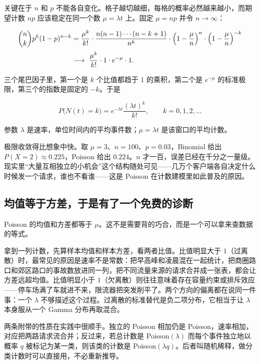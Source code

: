 关键在于 \(n\) 和 \(p\) 不能各自变化。格子越切越细，每格的概率必然越来越小，而期望计数 \(np\) 应该稳定在同一个数 \(\mu=\lambda t\) 上。固定 \(\mu=np\) 并令 \(n\to\infty\)：

\[
\begin{aligned}
\binom nk p^k(1-p)^{n-k}
&=\frac{\mu^k}{k!}\cdot\frac{n(n-1)\cdots(n-k+1)}{n^k}
\cdot\Bigl(1-\frac\mu n\Bigr)^{n}\cdot\Bigl(1-\frac\mu n\Bigr)^{-k}\\[2pt]
&\longrightarrow\ \frac{\mu^k}{k!}\cdot 1\cdot e^{-\mu}\cdot 1 .
\end{aligned}
\]

三个尾巴因子里，第一个是 \(k\) 个比值都趋于 \(1\) 的乘积，第二个是 \(e^{-\mu}\) 的标准极限，第三个的指数是固定的 \(-k\)。于是

\[
P\bigl(N(t)=k\bigr)=e^{-\lambda t}\frac{(\lambda t)^k}{k!},\qquad k=0,1,2,\ldots
\]

参数 \(\lambda\) 是速率，单位时间内的平均事件数；\(\mu=\lambda t\) 是该窗口的平均计数。

极限收敛得比想象中快。取 \(\mu=3\)、\(n=100\)、\(p=0.03\)，Binomial 给出 \(P(X=2)\approx0.225\)，Poisson 给出 \(0.224\)。\(n\) 才一百，误差已经在千分之一量级。现实里``大量互相独立的小机会''这个结构随处可见——几万个客户端各自决定什么时候发一个请求，谁也不看谁——这是 Poisson 在计数建模里如此普及的原因。

\subsection{均值等于方差，于是有了一个免费的诊断}

Poisson 的均值和方差都等于 \(\mu\)。这不是需要背的巧合，而是一个可以拿来查数据的等式。

拿到一列计数，先算样本均值和样本方差，看两者比值。比值明显大于 \(1\)（过离散）时，最常见的原因是速率不是常数：把早高峰和凌晨混在一起统计，把商圈路口和郊区路口的事故数放进同一列，把不同流量来源的请求合并成一张表，都会让方差远超均值。比值明显小于 \(1\)（欠离散）则往往意味着存在容量约束或排斥效应——停车场满了车就进不来，限流器把突发削平了。两个方向的偏离都在说同一件事：一个 \(\lambda\) 不够描述这个过程。过离散的标准替代是负二项分布，它相当于让 \(\lambda\) 本身服从一个 Gamma 分布再取混合。

两条附带的性质在实践中很顺手。独立的 Poisson 相加仍是 Poisson，速率相加，对应把两路请求流合并；反过来，若总计数是 Poisson\((\lambda)\) 而每个事件独立地以概率 \(q\) 被标记为某一类，则该类的计数是 Poisson\((\lambda q)\)。后者叫随机稀释，做分类计数时可以直接用，不必重新推导。

